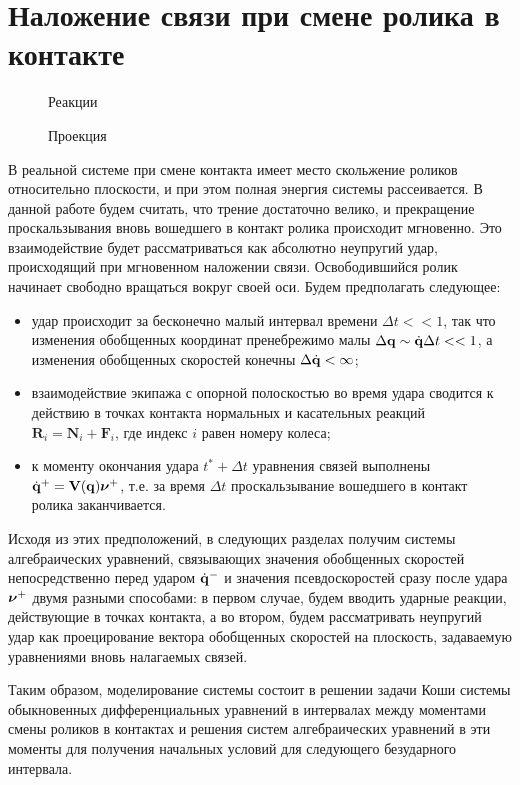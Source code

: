 \section{Наложение связи при смене ролика в контакте}

\begin{figure}[h]
        \centering
        \caption{Реакции}
        \label{fig:react}
    \endminipage
        \centering
        \caption{Проекция}
        \label{fig:project}
    \endminipage
\end{figure}

В реальной системе при смене контакта имеет место скольжение роликов относительно плоскости, и при этом полная энергия системы рассеивается. В данной работе будем считать, что трение достаточно велико, и прекращение проскальзывания вновь вошедшего в контакт ролика происходит мгновенно. Это взаимодействие будет рассматриваться как абсолютно неупругий удар, происходящий при мгновенном наложении связи.
Освободившийся ролик начинает свободно вращаться вокруг своей оси.
Будем предполагать следующее:
\begin{itemize}
    \item удар происходит за бесконечно малый интервал времени $\Delta t << 1$, так что изменения обобщенных координат пренебрежимо малы $\Delta \mathbf{q} \sim \dot{\mathbf{q}}\Delta t << 1$, а изменения обобщенных скоростей конечны $\Delta \dot{\mathbf{q}} < \infty$;
    \item взаимодействие экипажа с опорной полоскостью во время удара сводится к действию в точках контакта нормальных и касательных реакций $\mathbf{R}_i = \mathbf{N}_i + \mathbf{F}_i$, где индекс $i$ равен номеру колеса;
    \item к моменту окончания удара $t^*+\Delta t$ уравнения связей выполнены $\dot{\mathbf{q}}^+ = \mathbf{V}(\mathbf{q})\boldsymbol{\mathbf{\nu}}^+$, т.е. за время $\Delta t$ проскальзывание вошедшего в контакт ролика заканчивается.
\end{itemize}


Исходя из этих предположений, в следующих разделах получим системы алгебраических уравнений, связывающих значения обобщенных скоростей непосредственно перед ударом $\dot{\mathbf{q}}^-$ и значения псевдоскоростей сразу после удара $\boldsymbol{\mathbf{\nu}}^+$ двумя разными способами: в первом случае, будем  вводить ударные реакции, действующие в точках контакта, а во втором, будем рассматривать неупругий удар как проецирование вектора обобщенных скоростей на плоскость, задаваемую уравнениями вновь налагаемых связей.

Таким образом, моделирование системы состоит в решении задачи Коши системы обыкновенных дифференциальных уравнений в интервалах между моментами смены роликов в контактах и решения систем алгебраических уравнений в эти моменты для получения начальных условий для следующего безударного интервала.
